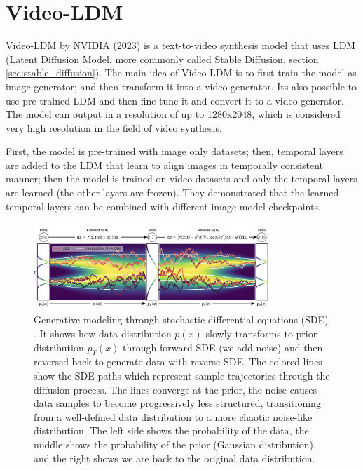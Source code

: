 \section{Video-LDM}
\label{sec:videoldm}

Video-LDM by NVIDIA (2023) \cite{video_ldm} is a text-to-video synthesis model that uses LDM (Latent Diffusion Model, more commonly called Stable Diffusion, section \ref{sec:stable_diffusion}). The main idea of Video-LDM is to first train the model as image generator; and then transform it into a video generator. Its also possible to use pre-trained LDM and then fine-tune it and convert it to a video generator. The model can output in a resolution of up to 1280x2048, which is considered very high resolution in the field of video synthesis.

First, the model is pre-trained with image only datasets; then, temporal layers are added to the LDM that learn to align images in temporally consistent manner; then the model is trained on video datasets and only the temporal layers are learned (the other layers are frozen). They demonstrated that the learned temporal layers can be combined with different image model checkpoints.

\begin{figure}
    \centering
    \includegraphics[width=0.8\textwidth]{images/video_ldm/ddpm_sde.png}
    \caption{Generative modeling through stochastic differential equations (SDE) \cite{song2020score}. It shows how data distribution $p(x)$ slowly transforms to prior distribution $p_T(x)$ through forward SDE (we add noise) and then reversed back to generate data with reverse SDE. The colored lines show the SDE paths which represent sample trajectories through the diffusion process. The lines converge at the prior, the noise causes data samples to become progressively less structured, transitioning from a well-defined data distribution to a more chaotic noise-like distribution. The left side shows the probability of the data, the middle shows the probability of the prior (Gaussian distribution), and the right shows we are back to the original data distribution.}
    \label{fig:video_ldm_stochastic}
\end{figure}

